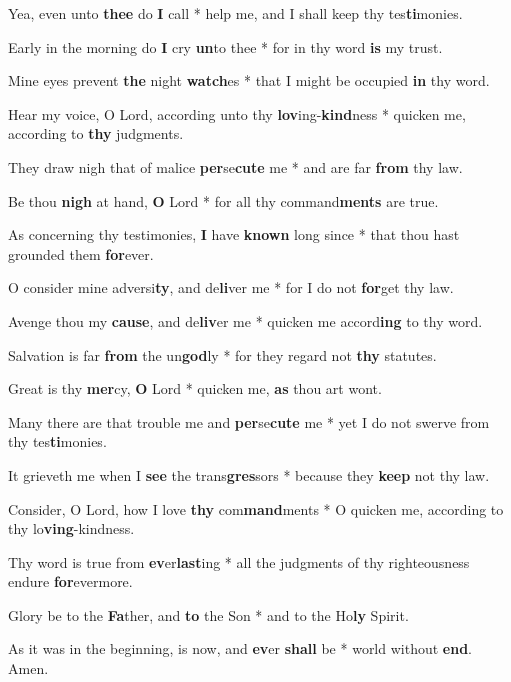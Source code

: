 \begin{multicols}{2}
	Yea, even unto \textbf{thee} do \textbf{I} call * help me, and I shall keep thy tes\textbf{ti}monies.
	
	Early in the morning do \textbf{I} cry \textbf{un}to thee * for in thy word \textbf{is} my trust.
	
	Mine eyes prevent \textbf{the} night \textbf{watch}es * that I might be occupied \textbf{in} thy word.
	
	Hear my voice, O Lord, according unto thy \textbf{lov}ing-\textbf{kind}ness * quicken me, according to \textbf{thy} judgments.
	
	They draw nigh that of malice \textbf{per}se\textbf{cute} me * and are far \textbf{from} thy law.
	
	Be thou \textbf{nigh} at hand, \textbf{O} Lord * for all thy command\textbf{ments} are true.
	
	As concerning thy testimonies, \textbf{I} have \textbf{known} long since * that thou hast grounded them \textbf{for}ever.
	
	O consider mine adversi\textbf{ty}, and de\textbf{li}ver me * for I do not \textbf{for}get thy law.
	
	Avenge thou my \textbf{cause}, and de\textbf{liv}er me * quicken me accord\textbf{ing} to thy word.
	
	Salvation is far \textbf{from} the un\textbf{god}ly * for they regard not \textbf{thy} statutes.
	
	Great is thy \textbf{mer}cy, \textbf{O} Lord * quicken me, \textbf{as} thou art wont.
	
	Many there are that trouble me and \textbf{per}se\textbf{cute} me * yet I do not swerve from thy tes\textbf{ti}monies.
	
	It grieveth me when I \textbf{see} the trans\textbf{gres}sors * because they \textbf{keep} not thy law.
	
	Consider, O Lord, how I love \textbf{thy} com\textbf{mand}ments * O quicken me, according to thy lo\textbf{ving}-kindness.
	
	Thy word is true from \textbf{ev}er\textbf{last}ing * all the judgments of thy righteousness endure \textbf{for}evermore.
	
	Glory be to the \textbf{Fa}ther, and \textbf{to} the Son * and to the Ho\textbf{ly} Spirit.
	
	As it was in the beginning, is now, and \textbf{ev}er \textbf{shall} be * world without \textbf{end}. Amen.
\end{multicols}